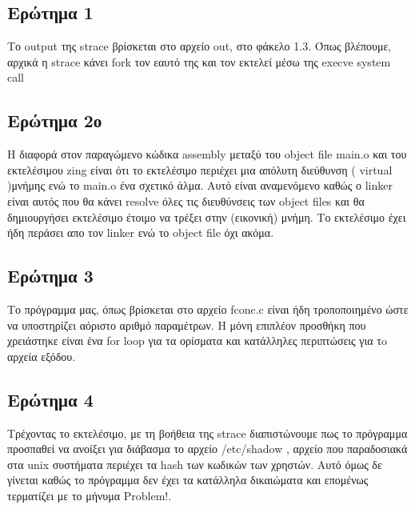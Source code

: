 \documentclass[12pt]{article}
\begin{document}
 \subsection*{Ερώτημα 1} Το \textlatin{output} της \textlatin{strace} βρίσκεται στο αρχείο \textlatin{out}, στο φάκελο \textlatin{1.3}. Όπως βλέπουμε, αρχικά η \textlatin{strace} κάνει \textlatin{fork} τον εαυτό της και τον εκτελεί μέσω της \textlatin{execve system call}
 
 \subsection*{Ερώτημα 2ο}
 Η διαφορά στον παραγώμενο κώδικα  \textlatin{assembly} μεταξύ του  \textlatin{object file}   \textlatin{main.o}  και του εκτελέσιμου \textlatin{zing} είναι ότι το εκτελέσιμο περιέχει μια απόλυτη διεύθυνση ( \textlatin{virtual} )μνήμης ενώ το  \textlatin{ main.o } ένα σχετικό άλμα. Αυτό είναι αναμενόμενο καθώς ο  \textlatin{linker} είναι αυτός που θα κάνει  \textlatin{resolve} όλες τις διευθύνσεις των  \textlatin{object files} και θα δημιουργήσει εκτελέσιμο έτοιμο να τρέξει στην (εικονική) μνήμη. Το εκτελέσιμο έχει ήδη περάσει απο τον \textlatin{linker} ενώ το \textlatin{object file} όχι ακόμα.
 
 
  \subsection*{Ερώτημα 3}
  
  Το πρόγραμμα μας, όπως βρίσκεται στο αρχείο \textlatin{fconc.c} είναι ήδη τροποποιημένο ώστε να υποστηρίζει αόριστο αριθμό παραμέτρων. Η μόνη επιπλέον προσθήκη που χρειάστηκε είναι ένα \textlatin{for loop} για τα ορίσματα και κατάλληλες περιπτώσεις για τo αρχεία εξόδου.
  
  \subsection*{Ερώτημα 4}
  Τρέχοντας το εκτελέσιμο, με τη βοήθεια της \textlatin{strace} διαπιστώνουμε πως το πρόγραμμα προσπαθεί να ανοίξει για διάβασμα το αρχείο \textlatin{/etc/shadow} , αρχείο που παραδοσιακά στα \textlatin{unix} συστήματα περιέχει τα \textlatin{hash} των κωδικών των χρηστών. Αυτό όμως δε γίνεται καθώς το πρόγραμμα δεν έχει τα κατάλληλα δικαιώματα και επομένως τερματίζει με το μήνυμα \textlatin{Problem!}.
  

 
 
 
 
 
 
 
\end{document}
